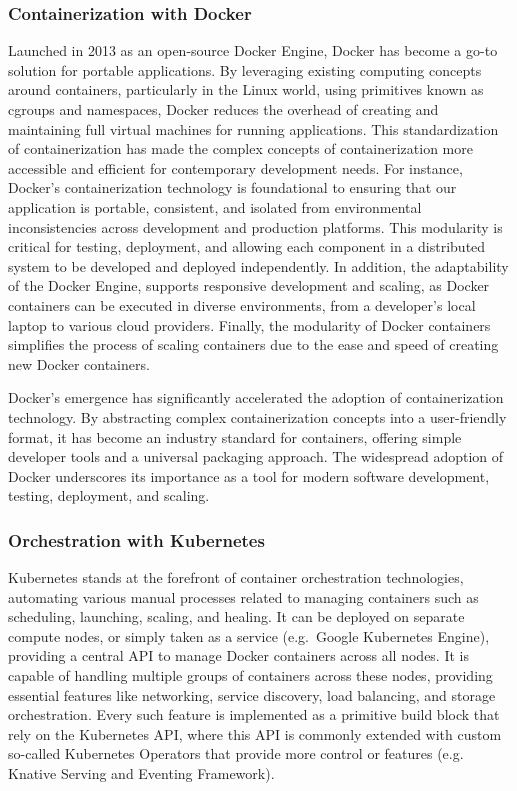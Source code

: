 \documentclass{report}
\begin{document}
    \subsubsection{Containerization with Docker}
    Launched in 2013 as an open-source Docker Engine, Docker has become a go-to solution for portable applications. By leveraging existing computing concepts around containers, particularly in the Linux world, using primitives known as cgroups and namespaces, Docker reduces the overhead of creating and maintaining full virtual machines for running applications. This standardization of containerization has made the complex concepts of containerization more accessible and efficient for contemporary development needs. For instance, Docker's containerization technology is foundational to ensuring that our application is portable, consistent, and isolated from environmental inconsistencies across development and production platforms. This modularity is critical for testing, deployment, and allowing each component in a distributed system to be developed and deployed independently. In addition, the adaptability of the Docker Engine, supports responsive development and scaling, as Docker containers can be executed in diverse environments, from a developer's local laptop to various cloud providers. Finally, the modularity of Docker containers simplifies the process of scaling containers due to the ease and speed of creating new Docker containers.

    Docker's emergence has significantly accelerated the adoption of containerization technology. By abstracting complex containerization concepts into a user-friendly format, it has become an industry standard for containers, offering simple developer tools and a universal packaging approach. The widespread adoption of Docker underscores its importance as a tool for modern software development, testing, deployment, and scaling.

    \subsubsection{Orchestration with Kubernetes}
    Kubernetes stands at the forefront of container orchestration technologies, automating various manual processes related to managing containers such as scheduling, launching, scaling, and healing. It can be deployed on separate compute nodes, or simply taken as a service (e.g.\ Google Kubernetes Engine), providing a central API to manage Docker containers across all nodes. It is capable of handling multiple groups of containers across these nodes, providing essential features like networking, service discovery, load balancing, and storage orchestration. Every such feature is implemented as a primitive build block that rely on the Kubernetes API, where this API is commonly extended with custom so-called Kubernetes Operators that provide more control or features (e.g. Knative Serving and Eventing Framework).
\end{document}
